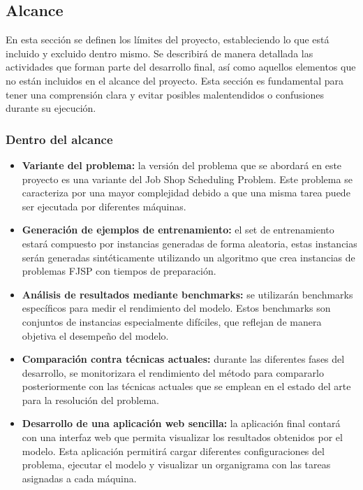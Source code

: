 \subsection{Alcance}
En esta sección se definen los límites del proyecto, estableciendo lo que está incluido 
y excluido dentro mismo. Se describirá de manera detallada las actividades que forman 
parte del desarrollo final, así como aquellos elementos que no están incluidos en el 
alcance del proyecto. Esta sección es fundamental para tener una comprensión clara 
y evitar posibles malentendidos o confusiones durante su ejecución.

\subsubsection{Dentro del alcance}
\begin{itemize}
    \item \textbf{Variante del problema:} la versión del problema que se abordará en este proyecto
    es una variante del Job Shop Scheduling Problem. Este problema se caracteriza por una mayor
    complejidad debido a que una misma tarea puede ser ejecutada por diferentes máquinas.
    \item \textbf{Generación de ejemplos de entrenamiento:} el set de entrenamiento estará compuesto
    por instancias generadas de forma aleatoria, estas instancias serán generadas sintéticamente 
    utilizando un algoritmo que crea instancias de problemas FJSP con tiempos de preparación. 
    \item \textbf{Análisis de resultados mediante benchmarks:} se utilizarán benchmarks
    específicos para medir el rendimiento del modelo. Estos benchmarks son conjuntos de instancias
    especialmente difíciles, que reflejan de manera objetiva el desempeño del modelo.
    \item \textbf{Comparación contra técnicas actuales:} durante las diferentes fases del desarrollo,
    se monitorizara el rendimiento del método para compararlo posteriormente con las técnicas actuales 
    que se emplean en el estado del arte para la resolución del problema. 
    \item \textbf{Desarrollo de una aplicación web sencilla:} la aplicación final contará con una interfaz 
    web que permita visualizar los resultados obtenidos por el modelo. Esta aplicación
    permitirá cargar diferentes configuraciones del problema, ejecutar el modelo y visualizar
    un organigrama con las tareas asignadas a cada máquina.
\end{itemize}

